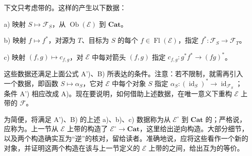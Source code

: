 下文只考虑带的。这样的产生以下数据：

a) 映射 $S\mapsto\mathcal F_S$，从 $\operatorname{Ob}(\mathcal E)$ 到 $\mathbf{Cat}$。

b) 映射 $f\mapsto f^*$，对源为 $T$、目标为 $S$ 的每个 $f\in\operatorname{Fl}(\mathcal E)$，指定 $f^*:\mathcal F_S\to\mathcal F_T$。

c) 映射 $(f,g)\mapsto c_{f,g}$，对 $\mathcal E$ 中每对箭头 $(f,g)$ 指定 $c_{f,g}:g^*f^*\to(fg)^*$。

这些数据还满足上面公式 A')、B) 所表达的条件。注意：若不限制，就需再引入一个数据，即函数 $S\mapsto\alpha_S$，它对 $\mathcal E$ 中每个对象 $S$ 指定 $\alpha_S:(\operatorname{id}_S)^*\to\operatorname{id}_{\mathcal F_S}$；条件 A') 相应改成 A)。现在要说明，如何借助上述数据，在唯一意义下重构 $\mathcal E$ 上带的 $\mathcal F$。

为简便，将满足 A')、B) 的上述 a)、b)、c) 数据称为从 $\mathcal E^\circ$ 到 $\mathbf{Cat}$ 的；严格说，应称为。上一节从 $\mathcal E$ 上带的构造了 $\mathcal E^\circ\to\mathbf{Cat}$，这里给出逆向构造。大部分细节，以及两个构造确实互为“逆”的核对，留给读者。准确地说，应将这些看作一个新的对象，并证明这两个构造在该与上一节定义的 $\mathcal E$ 上带的之间，给出互为的等价。


